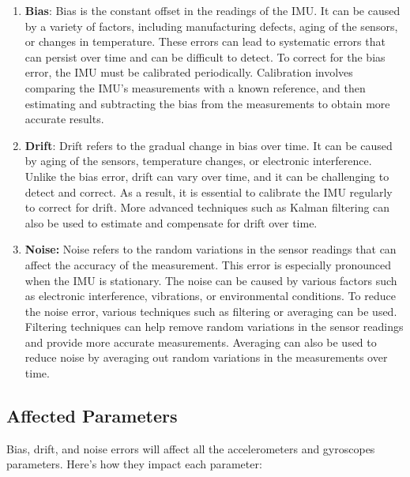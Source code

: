 \bigskip


\begin{enumerate}
	\item\textbf{Bias}: Bias is the constant offset in the readings of the IMU. It can be caused by a variety of factors, including manufacturing defects, aging of the sensors, or changes in temperature. These errors can lead to systematic errors that can persist over time and can be difficult to detect. To correct for the bias error, the IMU must be calibrated periodically. Calibration involves comparing the IMU's measurements with a known reference, and then estimating and subtracting the bias from the measurements to obtain more accurate results.\cite{sabatini:2011}
	
	\item \textbf{Drift}: Drift refers to the gradual change in bias over time. It can be caused by aging of the sensors, temperature changes, or electronic interference. Unlike the bias error, drift can vary over time, and it can be challenging to detect and correct. As a result, it is essential to calibrate the IMU regularly to correct for drift. More advanced techniques such as Kalman filtering can also be used to estimate and compensate for drift over time.\cite{Tedaldi:2014}
	
	\item \textbf{Noise:} Noise refers to the random variations in the sensor readings that can affect the accuracy of the measurement. This error is especially pronounced when the IMU is stationary. The noise can be caused by various factors such as electronic interference, vibrations, or environmental conditions. To reduce the noise error, various techniques such as filtering or averaging can be used. Filtering techniques can help remove random variations in the sensor readings and provide more accurate measurements. Averaging can also be used to reduce noise by averaging out random variations in the measurements over time.\cite{Faragher:2014}
\end{enumerate}

\subsection{Affected Parameters}
Bias, drift, and noise errors will affect all the accelerometers and gyroscopes parameters. Here's how they impact each parameter:


